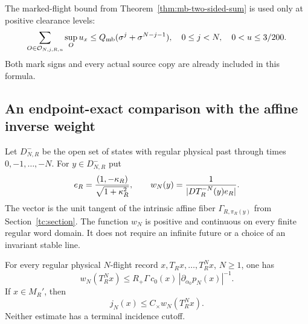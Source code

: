 The marked-flight bound from Theorem~\ref{thm:mb-two-sided-sum}
is used only at positive clearance levels:
\begin{equation}\label{ps:marked-input}
 \sum_{O\in\mathcal O_{N,j,R,u}}\sup_Ou_x
 \le Q_{\rm mb}(\sigma^j+\sigma^{N-j-1}),
 \quad 0\le j<N,\quad 0<u\le3/200.
\end{equation}
Both mark signs and every actual source copy are already included
in this formula.

\subsection{An endpoint-exact comparison with the affine inverse weight}

Let $D^-_{N,R}$ be the open set of states with regular physical past
through times $0,-1,\ldots,-N$.  For $y\in D^-_{N,R}$ put
\begin{equation}\label{ps:affine-weight}
 e_R={ (1,-\kappa_R)\over\sqrt{1+\kappa_R^2}},
 \qquad
 w_N(y)={1\over |D T_R^{-N}(y)e_R|}.
\end{equation}
The vector is the unit tangent of the intrinsic affine fiber
$\Gamma_{R,\pi_R(y)}$ from Section~\ref{tc:section}.  The function
$w_N$ is positive and continuous on every finite regular word domain.
It does not require an infinite future or a choice of an invariant
stable line.

\begin{lemma}
\label{ps:matrix}
For every regular physical $N$-flight record $x,T_Rx,\ldots,T_R^Nx$,
$N\ge1$, one has
\begin{equation}\label{ps:matrix-bound}
 w_N(T_R^Nx)\le R_+\Gamma\,c_0(x)\,
                          |\partial_{\alpha_0}p_N(x)|^{-1}.
\end{equation}
If $x\in M_R'$, then
\begin{equation}\label{ps:true-stable}
 j_N(x)\le C_\times w_N(T_R^Nx).
\end{equation}
Neither estimate has a terminal incidence cutoff.
\end{lemma}

